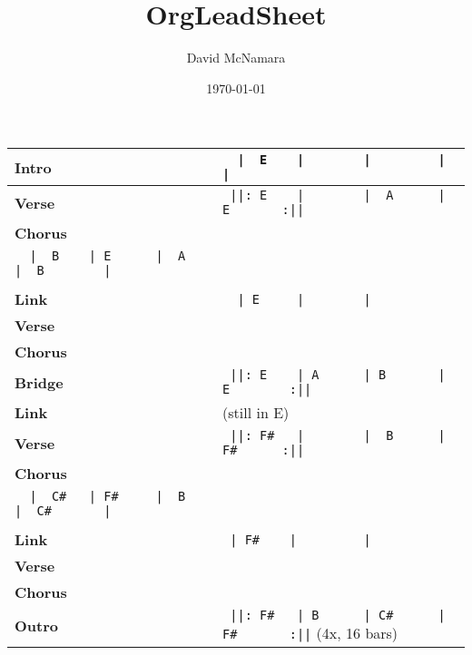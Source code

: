\documentclass{LeadMemo}
\title{OrgLeadSheet}
\author{David McNamara}
\date{\today}
\begin{document}
\maketitle

\def\arraystretch{2.5}
\begin{tabular}[h]{ p{}  p{}  }
    \huge\textbf{Intro\vfill}         &\large\verb!  |  E    |        |         |           |!\\
    \hline
    \huge\textbf{Verse}  &\large\verb! ||: E    |        |  A      |  E       :||!\\
    \hline
    \huge\textbf{Chorus} &  \begin{minipage}[t]{\textwidth}
    \large\verb!  |  B    | E      |  B      |  E        |!\\ 
    \large\verb!  |  B    | E      |  A      |  B        |!\\
    \end{minipage}
    \\ 
    \hline
    \huge\textbf{Link\vfill}             &\large\verb!  | E     |        |!\\
    \hline
    \huge\textbf{Verse}  &  \\
    \hline
    \huge\textbf{Chorus}  &  \\
    \hline
    \huge\textbf{Bridge}  &\large\verb! ||: E    | A      | B       | E        :||!\\
    \hline
    \huge\textbf{Link\vfill}  &  (still in E) \\
    \hline
    \huge\textbf{Verse}  &\large\verb! ||: F#   |        |  B      |  F#      :||!\\
    \hline
    \huge\textbf{Chorus} &  \begin{minipage}[t]{\textwidth}
    \large\verb!  |  C#   | F#     |  C#     |  F#       |!\\ 
    \large\verb!  |  C#   | F#     |  B      |  C#       |!\\
    \end{minipage}
    \\ 
    \hline
    \huge\textbf{Link\vfill}             &\large\verb! | F#    |         |!\\
    \hline
    \huge\textbf{Verse} & \\
    \hline
    \huge\textbf{Chorus} & \\
    \hline
    \huge\textbf{Outro}  &\large\verb! ||: F#   | B      | C#      | F#       :||! (4x, 16 bars)\\
 \end{tabular}
\def\arraystretch{1.0}
\end{document}
